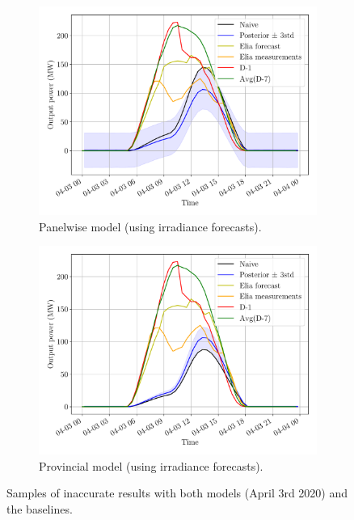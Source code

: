 \documentclass[a4paper, 12pt]{article}
\begin{document}
\begin{figure}[H]
	\centering
	\begin{subfigure}{0.48\textwidth}
		\centering
		\includegraphics[width=\textwidth]{resources/pdf/solar_panelwise_START_FOR_03-04-2020.pdf}
		\caption{Panelwise model (using irradiance forecasts).}
		\label{fig:panelwise_bad_1}
	\end{subfigure}
	\hspace{0.5em}
	\begin{subfigure}{0.48\textwidth}
		\centering
		\includegraphics[width=\textwidth]{resources/pdf/solar_provincial_START_FOR_03-04-2020.pdf}
		\caption{Provincial model (using irradiance forecasts).}
		\label{fig:provincial_bad_1}
	\end{subfigure}
	\caption{Samples of inaccurate results with both models (April 3rd 2020) and the baselines.}
	\label{fig:bad_results_april_3rd}
\end{figure}
\end{document}
